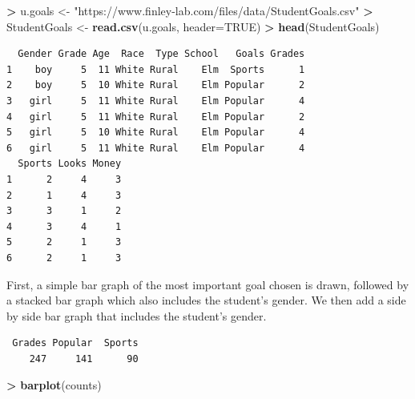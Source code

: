 \documentclass[
]{krantz}
\makeatletter
\newenvironment{Shaded}{\begin{snugshade}}{\end{snugshade}}
\newcommand{\DataTypeTok}[1]{\textcolor[rgb]{0.27,0.27,0.27}{#1}}
\newcommand{\KeywordTok}[1]{\textcolor[rgb]{0.27,0.27,0.27}{\textbf{#1}}}
\newcommand{\NormalTok}[1]{#1}
\newcommand{\OperatorTok}[1]{\textcolor[rgb]{0.43,0.43,0.43}{\textbf{#1}}}
\newcommand{\OtherTok}[1]{\textcolor[rgb]{0.37,0.37,0.37}{#1}}
\newcommand{\StringTok}[1]{\textcolor[rgb]{0.5,0.5,0.5}{#1}}
\newenvironment{kframe}{%
\medskip{}
\setlength{\fboxsep}{.8em}
 \def\at@end@of@kframe{}%
 \ifinner\ifhmode%
  \def\at@end@of@kframe{\end{minipage}}%
  \begin{minipage}{\columnwidth}%
 \fi\fi%
 \def\FrameCommand##1{\hskip\@totalleftmargin \hskip-\fboxsep
 \colorbox{shadecolor}{##1}\hskip-\fboxsep
     \hskip-\linewidth \hskip-\@totalleftmargin \hskip\columnwidth}%
 \MakeFramed {\advance\hsize-\width
   \@totalleftmargin\z@ \linewidth\hsize
   \@setminipage}}%
 {\par\unskip\endMakeFramed%
 \at@end@of@kframe}
\renewenvironment{Shaded}{\begin{kframe}}{\end{kframe}}
\makeatother
\begin{document}
\begin{Shaded}
\begin{Highlighting}[]
\OperatorTok{\textgreater{}}\StringTok{ }\NormalTok{u.goals \textless{}{-}}\StringTok{ "https://www.finley{-}lab.com/files/data/StudentGoals.csv"}
\OperatorTok{\textgreater{}}\StringTok{ }\NormalTok{StudentGoals \textless{}{-}}\StringTok{ }\KeywordTok{read.csv}\NormalTok{(u.goals, }\DataTypeTok{header=}\OtherTok{TRUE}\NormalTok{)}
\OperatorTok{\textgreater{}}\StringTok{ }\KeywordTok{head}\NormalTok{(StudentGoals)}
\end{Highlighting}
\end{Shaded}

\begin{verbatim}
  Gender Grade Age  Race  Type School   Goals Grades
1    boy     5  11 White Rural    Elm  Sports      1
2    boy     5  10 White Rural    Elm Popular      2
3   girl     5  11 White Rural    Elm Popular      4
4   girl     5  11 White Rural    Elm Popular      2
5   girl     5  10 White Rural    Elm Popular      4
6   girl     5  11 White Rural    Elm Popular      4
  Sports Looks Money
1      2     4     3
2      1     4     3
3      3     1     2
4      3     4     1
5      2     1     3
6      2     1     3
\end{verbatim}

First, a simple bar graph of the most important goal chosen is drawn, followed by a stacked bar graph which also includes the student's gender. We then add a side by side bar graph that includes the student's gender.

\begin{Shaded}
\end{Shaded}

\begin{verbatim}
 Grades Popular  Sports 
    247     141      90 
\end{verbatim}

\begin{Shaded}
\begin{Highlighting}[]
\OperatorTok{\textgreater{}}\StringTok{ }\KeywordTok{barplot}\NormalTok{(counts)}
\end{Highlighting}
\end{Shaded}
\end{document}
